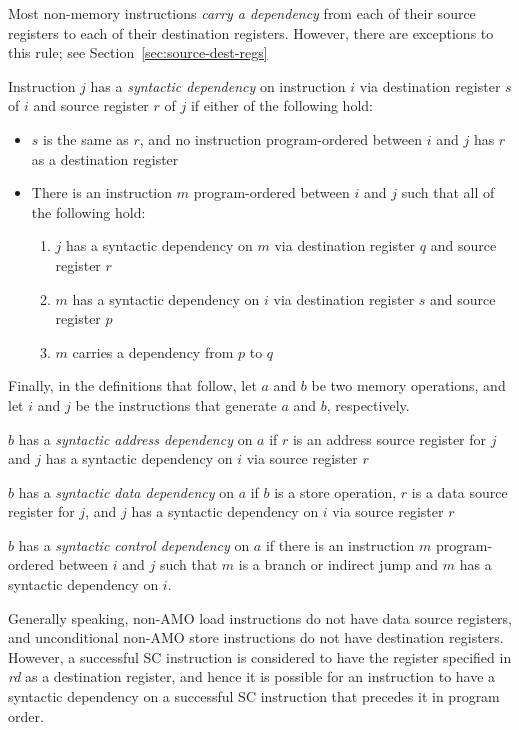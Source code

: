 Most non-memory instructions {\em carry a dependency} from each of their source registers to each of their destination registers.
However, there are exceptions to this rule; see Section~\ref{sec:source-dest-regs}

Instruction $j$ has a {\em syntactic dependency} on instruction $i$ via destination register $s$ of $i$ and source register $r$ of $j$ if either of the following hold:
\begin{itemize}
  \item $s$ is the same as $r$, and no instruction program-ordered between $i$ and $j$ has $r$ as a destination register
  \item There is an instruction $m$ program-ordered between $i$ and $j$ such that all of the following hold:
    \begin{enumerate}
      \item $j$ has a syntactic dependency on $m$ via destination register $q$ and source register $r$
      \item $m$ has a syntactic dependency on $i$ via destination register $s$ and source register $p$
      \item $m$ carries a dependency from $p$ to $q$
    \end{enumerate}
\end{itemize}

Finally, in the definitions that follow, let $a$ and $b$ be two memory operations, and let $i$ and $j$ be the instructions that generate $a$ and $b$, respectively.

$b$ has a {\em syntactic address dependency} on $a$ if $r$ is an address source register for $j$ and $j$ has a syntactic dependency on $i$ via source register $r$

$b$ has a {\em syntactic data dependency} on $a$ if $b$ is a store operation, $r$ is a data source register for $j$, and $j$ has a syntactic dependency on $i$ via source register $r$

$b$ has a {\em syntactic control dependency} on $a$ if there is an instruction $m$ program-ordered between $i$ and $j$ such that $m$ is a branch or indirect jump and $m$ has a syntactic dependency on $i$.

\begin{commentary}
  Generally speaking, non-AMO load instructions do not have data source registers, and unconditional non-AMO store instructions do not have destination registers.  However, a successful SC instruction is considered to have the register specified in {\em rd} as a destination register, and hence it is possible for an instruction to have a syntactic dependency on a successful SC instruction that precedes it in program order.
\end{commentary}

